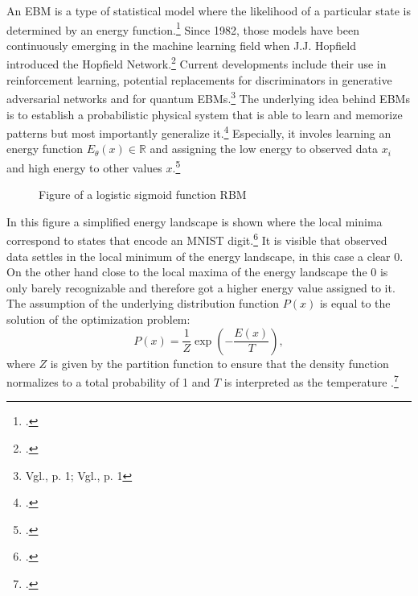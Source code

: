 An \ac{EBM} is a type of statistical model where the likelihood of a particular state is determined by an energy function.\footcite[Vgl.][2]{huembeliPhysicsEnergybasedModels2022}
Since 1982, those models have been continuously emerging in the machine learning field when J.J. Hopfield introduced the Hopfield Network.\footcite[Vgl.][]{hopfieldNeuralNetworksPhysical1982}
Current developments include their use in reinforcement learning, potential replacements for discriminators in generative adversarial networks and for quantum \ac{EBM}s.\footnote{Vgl.\cite{verdonQuantumHamiltonianBasedModels2019}, p. 1; Vgl.\cite{duModelBasedPlanning2021}, p. 1}
The underlying idea behind \ac{EBM}s is to establish a probabilistic physical system that is able to learn and memorize patterns but most importantly generalize it.\footcite[Vgl.][2]{huembeliPhysicsEnergybasedModels2022} 
Especially, it involes learning an energy function \(E_{\theta}(x) \in \mathbb{R}\) and assigning the low energy to observed data \(x_i\) and high energy to other values \(x\).\footcite[Vgl.][330]{gustafssonEnergyBasedModelsDeep2020}
\begin{figure}[H]
    \centering
    \caption{Figure of a logistic sigmoid function \ac{RBM}}
\end{figure}
In this figure a simplified energy landscape is shown where the local minima correspond to states that encode an MNIST digit.\footcite[Vgl.][6]{huembeliPhysicsEnergybasedModels2022} It is visible that observed data settles in the local minimum of the energy landscape, in this case a clear 0. On the other hand close to the local maxima of the energy landscape the 0 is only barely recognizable and therefore got a higher energy value assigned to it.
The assumption of the underlying distribution function \( P(x) \)  is equal to the solution of the optimization problem:
\begin{equation}
    P(x) = \frac{1}{Z} \exp\left(-\frac{E(x)}{T}\right),
\end{equation}
where \( Z \) is given by the partition function to ensure
that the density function normalizes to a total probability of 1 and \( T \) is interpreted as the temperature .\footcite[Vgl.][2-3]{huembeliPhysicsEnergybasedModels2022}
